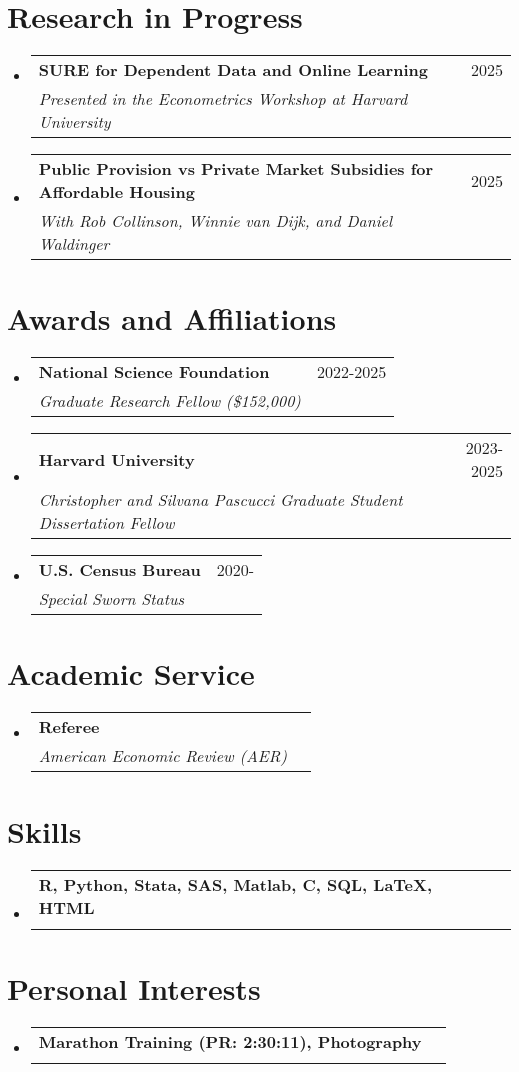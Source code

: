 \documentclass[12pt,]{article}
\makeatletter
\newcommand{\resumeSubheading}[4]{
  \vspace{-2pt}\item
    \begin{tabular*}{0.97\textwidth}[t]{l@{\extracolsep{\fill}}r}
      \textbf{#1} & #2 \\
      \textit{\small#3} & {\small #4} \\
    \end{tabular*}\vspace{-7pt}
}
\newcommand{\CC}{C\nolinebreak\hspace{-.05em}\raisebox{.3ex}{\small\bf +}\nolinebreak\hspace{-.10em}\raisebox{.3ex}{\small\bf +}}
\makeatother
\begin{document}
\section*{Research in Progress}
\begin{itemize}[leftmargin=0.09in, label={}]
\resumeSubheading
      {SURE for Dependent Data and Online Learning}{2025}
      {{Presented in the Econometrics Workshop at Harvard University}}{}
\resumeSubheading
      {Public Provision vs Private Market Subsidies for Affordable Housing}{2025}
      {{With Rob Collinson, Winnie van Dijk, and Daniel Waldinger}}{}
\end{itemize}

\section*{Awards and Affiliations}
\begin{itemize}[leftmargin=0.09in, label={}]
\resumeSubheading
      {National Science Foundation}{2022-2025}
      {Graduate Research Fellow (\$152,000)}{}
\resumeSubheading
      {Harvard University}{2023-2025}
      {Christopher and Silvana Pascucci Graduate Student Dissertation Fellow}{}
\resumeSubheading
      {U.S. Census Bureau}{2020-}
      {Special Sworn Status}{}
\end{itemize}

\section*{Academic Service}
\begin{itemize}[leftmargin=0.09in, label={}]
\resumeSubheading
      {Referee}{}
      {American Economic Review (AER)}{}
\end{itemize}
\section*{Skills}
\begin{itemize}[leftmargin=0.09in, label={}]
\resumeSubheading
      {{\normalfont R, Python, Stata, SAS, Matlab, \CC, SQL, \LaTeX, HTML}}{}
      {}{}
\end{itemize}
\section*{Personal Interests}
\begin{itemize}[leftmargin=0.09in, label={}]
\resumeSubheading
      {{\normalfont Marathon Training (PR: 2:30:11), Photography}}{}
      {}{}
\end{itemize}
\end{document}
